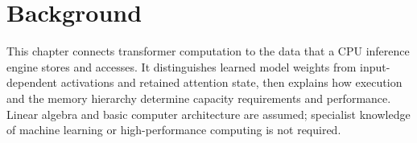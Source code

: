 \chapter{Background}
\label{chap:theoretical-background}

This chapter connects transformer computation to the data that a CPU
inference engine stores and accesses.  It distinguishes learned model
weights from input-dependent activations and retained attention state,
then explains how execution and the memory hierarchy determine capacity
requirements and performance.  Linear algebra and basic computer
architecture are assumed; specialist knowledge of machine learning or
high-performance computing is not required.









\cleardoublepage

